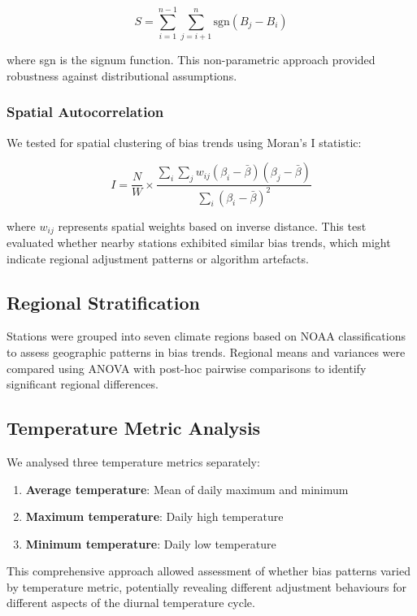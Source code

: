\documentclass[11pt, a4paper]{article}
\begin{document}
\begin{equation}
S = \sum_{i=1}^{n-1} \sum_{j=i+1}^{n} \text{sgn}(B_j - B_i)
\end{equation}

where sgn is the signum function. This non-parametric approach provided robustness against distributional assumptions.

\subsubsection{Spatial Autocorrelation}
We tested for spatial clustering of bias trends using Moran's I statistic:

\begin{equation}
I = \frac{N}{W} \times \frac{\sum_i \sum_j w_{ij}(\beta_i - \bar{\beta})(\beta_j - \bar{\beta})}{\sum_i(\beta_i - \bar{\beta})^2}
\end{equation}

where $w_{ij}$ represents spatial weights based on inverse distance. This test evaluated whether nearby stations exhibited similar bias trends, which might indicate regional adjustment patterns or algorithm artefacts.

\subsection{Regional Stratification}

Stations were grouped into seven climate regions based on NOAA classifications to assess geographic patterns in bias trends. Regional means and variances were compared using ANOVA with post-hoc pairwise comparisons to identify significant regional differences.

\subsection{Temperature Metric Analysis}

We analysed three temperature metrics separately:
\begin{enumerate}
    \item \textbf{Average temperature}: Mean of daily maximum and minimum
    \item \textbf{Maximum temperature}: Daily high temperature
    \item \textbf{Minimum temperature}: Daily low temperature
\end{enumerate}

This comprehensive approach allowed assessment of whether bias patterns varied by temperature metric, potentially revealing different adjustment behaviours for different aspects of the diurnal temperature cycle.
\end{document}
